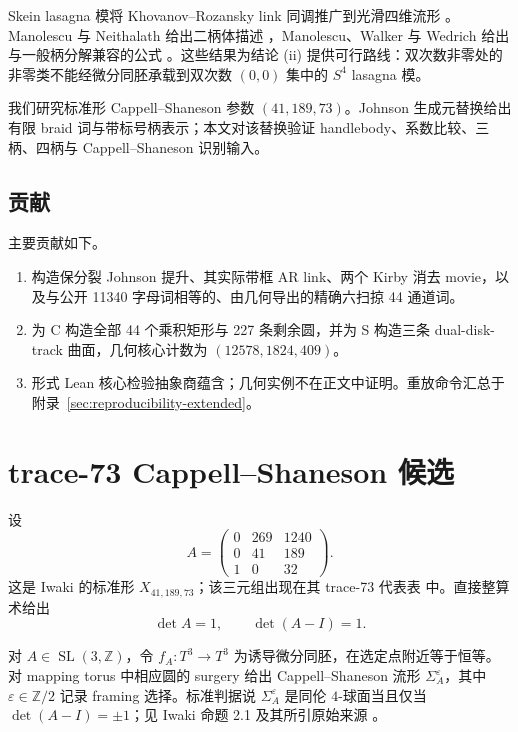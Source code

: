 \documentclass[11pt]{amsart}
\theoremstyle{definition}
\theoremstyle{remark}
\newcommand{\Z}{\mathbb{Z}}
\begin{document}
Skein lasagna 模将 Khovanov--Rozansky link 同调推广到光滑四维流形 \cite{MorrisonWalkerWedrich2019}。Manolescu 与 Neithalath 给出二柄体描述 \cite{ManolescuNeithalath2020}，Manolescu、Walker 与 Wedrich 给出与一般柄分解兼容的公式 \cite{ManolescuWalkerWedrich2023}。这些结果为结论 (ii) 提供可行路线：双次数非零处的非零类不能经微分同胚承载到双次数 $(0,0)$ 集中的 $S^4$ lasagna 模。

我们研究标准形 Cappell--Shaneson 参数 $(41,189,73)$。Johnson 生成元替换给出有限 braid 词与带标号柄表示；本文对该替换验证 handlebody、系数比较、三柄、四柄与 Cappell--Shaneson 识别输入。

\subsection*{贡献}

主要贡献如下。
\begin{enumerate}
\item 构造保分裂 Johnson 提升、其实际带框 AR link、两个 Kirby 消去 movie，以及与公开 11340 字母词相等的、由几何导出的精确六扫掠 44 通道词。
\item 为 C 构造全部 44 个乘积矩形与 227 条剩余圆，并为 S 构造三条 dual-disk-track 曲面，几何核心计数为 $(12578,1824,409)$。
\item 形式 Lean 核心检验抽象商蕴含；几何实例不在正文中证明。重放命令汇总于附录~\ref{sec:reproducibility-extended}。
\end{enumerate}
\section{trace-73 Cappell--Shaneson 候选}

设
\begin{equation}\label{eq:A}
A=\begin{pmatrix}
0&269&1240\\
0&41&189\\
1&0&32
\end{pmatrix}.
\end{equation}
这是 Iwaki 的标准形 $X_{41,189,73}$；该三元组出现在其 trace-73 代表表 \cite[Table 2]{Iwaki2024} 中。直接整算术给出
\begin{equation}\label{eq:determinants}
\det A=1,\qquad \det(A-I)=1.
\end{equation}

对 $A\in \operatorname{SL}(3,\Z)$，令 $f_A:T^3\to T^3$ 为诱导微分同胚，在选定点附近等于恒等。对 mapping torus 中相应圆的 surgery 给出 Cappell--Shaneson 流形 $\Sigma_A^\varepsilon$，其中 $\varepsilon\in\Z/2$ 记录 framing 选择。标准判据说 $\Sigma_A^\varepsilon$ 是同伦 $4$-球面当且仅当 $\det(A-I)=\pm1$；见 Iwaki 命题 2.1 及其所引原始来源 \cite{Iwaki2024,CappellShaneson1976}。
\end{document}
